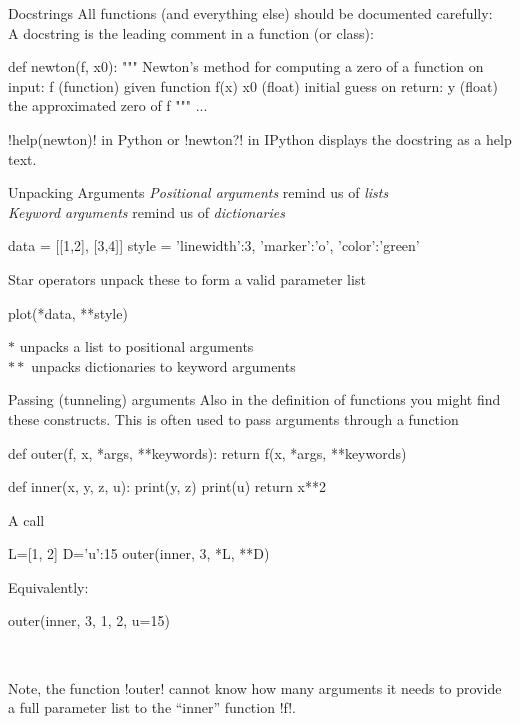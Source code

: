 \documentclass[hyperref={pdfpagelabels=false},table]{beamer}
\begin{document}
\begin{frame}[fragile]{Docstrings}
All functions (and everything else) should be documented
carefully:\\
\vfill
A docstring is the leading comment in a function (or class):\\ \vfill
\begin{python}
def newton(f, x0):
    """
    Newton's method for computing a zero of a function
    on input:
    f  (function) given function f(x)
    x0 (float) initial guess
    on return:
    y  (float) the approximated zero of f
    """
    ...
\end{python}
\pyth!help(newton)! in Python or \pyth!newton?! in IPython
displays the docstring as a help text.
\end{frame}
\begin{frame}[fragile]{Unpacking Arguments }
\emph{Positional arguments} remind us of \emph{lists} \\
\emph{Keyword arguments} remind us of \emph{dictionaries}\\
\vfill
\begin{python}
data = [[1,2], [3,4]]
style = {'linewidth':3, 'marker':'o', 'color':'green'}
\end{python}
\vfill
Star operators unpack these to form a valid parameter list
\begin{python}
plot(*data, **style)
\end{python}
\vfill
$\ast$ unpacks a list to positional arguments\\
$\ast\ast$ unpacks dictionaries to keyword arguments
\end{frame}
\begin{frame}[fragile]{Passing (tunneling) arguments}
 Also in the definition of functions you might find these constructs.
This is often used to pass arguments through a function
\begin{python}
def outer(f, x, *args, **keywords):
   return f(x, *args, **keywords)

def inner(x, y, z, u):
   print(y, z)
   print(u)
   return x**2
\end{python}
\begin{minipage}[top]{.45\textwidth}
 A call
\begin{python}
L=[1, 2]
D={'u':15}
outer(inner, 3, *L, **D)
\end{python}
\end{minipage} \hfill
\begin{minipage}[top]{.5\textwidth}
Equivalently:
\begin{python}
outer(inner, 3, 1, 2, u=15)
\end{python}
\end{minipage}\\
\vfill

Note, the function \pyth!outer! cannot know how many arguments it needs
to provide a full parameter list to the ``inner'' function \pyth!f!.
\end{frame}
\end{document}
